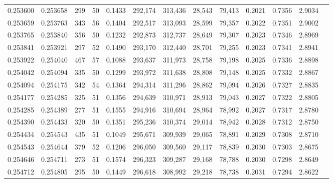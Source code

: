 \begin{tabular}{rrrrrrrrrrrrr}
0.253600 & 0.253658 &   299 &  50 &                                     0.1433 & 292,174 & 313,436 &  28,543 &  79,413 & 0.2021 & 0.7356 & 2.9034 \\
0.253659 & 0.253763 &   343 &  56 &                                     0.1404 & 292,517 & 313,093 &  28,599 &  79,357 & 0.2022 & 0.7351 & 2.9002 \\
0.253765 & 0.253840 &   356 &  50 &                                     0.1232 & 292,873 & 312,737 &  28,649 &  79,307 & 0.2023 & 0.7346 & 2.8969 \\
0.253841 & 0.253921 &   297 &  52 &                                     0.1490 & 293,170 & 312,440 &  28,701 &  79,255 & 0.2023 & 0.7341 & 2.8941 \\
0.253922 & 0.254040 &   467 &  57 &                                     0.1088 & 293,637 & 311,973 &  28,758 &  79,198 & 0.2025 & 0.7336 & 2.8898 \\
0.254042 & 0.254094 &   335 &  50 &                                     0.1299 & 293,972 & 311,638 &  28,808 &  79,148 & 0.2025 & 0.7332 & 2.8867 \\
0.254094 & 0.254175 &   342 &  54 &                                     0.1364 & 294,314 & 311,296 &  28,862 &  79,094 & 0.2026 & 0.7327 & 2.8835 \\
0.254177 & 0.254285 &   325 &  51 &                                     0.1356 & 294,639 & 310,971 &  28,913 &  79,043 & 0.2027 & 0.7322 & 2.8805 \\
0.254285 & 0.254389 &   277 &  51 &                                     0.1555 & 294,916 & 310,694 &  28,964 &  78,992 & 0.2027 & 0.7317 & 2.8780 \\
0.254390 & 0.254433 &   320 &  50 &                                     0.1351 & 295,236 & 310,374 &  29,014 &  78,942 & 0.2028 & 0.7312 & 2.8750 \\
0.254434 & 0.254543 &   435 &  51 &                                     0.1049 & 295,671 & 309,939 &  29,065 &  78,891 & 0.2029 & 0.7308 & 2.8710 \\
0.254543 & 0.254644 &   379 &  52 &                                     0.1206 & 296,050 & 309,560 &  29,117 &  78,839 & 0.2030 & 0.7303 & 2.8675 \\
0.254646 & 0.254711 &   273 &  51 &                                     0.1574 & 296,323 & 309,287 &  29,168 &  78,788 & 0.2030 & 0.7298 & 2.8649 \\
0.254712 & 0.254805 &   295 &  50 &                                     0.1449 & 296,618 & 308,992 &  29,218 &  78,738 & 0.2031 & 0.7294 & 2.8622 \\

\end{tabular}
